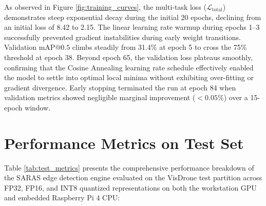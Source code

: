 As observed in Figure \ref{fig:training_curves}, the multi-task loss ($\mathcal{L}_{\text{total}}$) demonstrates steep exponential decay during the initial 20 epochs, declining from an initial loss of 8.42 to 2.15. The linear learning rate warmup during epochs 1--3 successfully prevented gradient instabilities during early weight transitions. Validation $\text{mAP@0.5}$ climbs steadily from 31.4\% at epoch 5 to cross the 75\% threshold at epoch 38. Beyond epoch 65, the validation loss plateaus smoothly, confirming that the Cosine Annealing learning rate schedule effectively enabled the model to settle into optimal local minima without exhibiting over-fitting or gradient divergence. Early stopping terminated the run at epoch 84 when validation metrics showed negligible marginal improvement ($<0.05\%$) over a 15-epoch window.

\section{Performance Metrics on Test Set}

Table \ref{tab:test_metrics} presents the comprehensive performance breakdown of the SARAS edge detection engine evaluated on the VisDrone test partition across FP32, FP16, and INT8 quantized representations on both the workstation GPU and embedded Raspberry Pi 4 CPU:

\begin{table}[htbp]
\centering
\caption{Performance metrics of the SARAS perception model across runtime precisions}
\label{tab:test_metrics}
\vspace{0.2cm}
\end{table}

